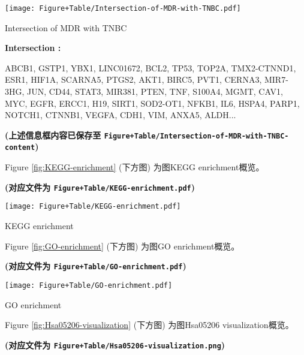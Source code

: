 \documentclass[
]{article}
\begin{document}
\def\@captype{figure}
\begin{center}
\texttt{[image: Figure+Table/Intersection-of-MDR-with-TNBC.pdf]}
\caption{Intersection of MDR with TNBC}\label{fig:Intersection-of-MDR-with-TNBC}
\end{center}
\begin{center}\begin{tcolorbox}[colback=gray!10, colframe=gray!50, width=0.9\linewidth, arc=1mm, boxrule=0.5pt]
\textbf{
Intersection
:}

\vspace{0.5em}

    ABCB1, GSTP1, YBX1, LINC01672, BCL2, TP53, TOP2A,
TMX2-CTNND1, ESR1, HIF1A, SCARNA5, PTGS2, AKT1, BIRC5,
PVT1, CERNA3, MIR7-3HG, JUN, CD44, STAT3, MIR381, PTEN,
TNF, S100A4, MGMT, CAV1, MYC, EGFR, ERCC1, H19, SIRT1,
SOD2-OT1, NFKB1, IL6, HSPA4, PARP1, NOTCH1, CTNNB1, VEGFA,
CDH1, VIM, ANXA5, ALDH...

\vspace{2em}
\end{tcolorbox}
\end{center}

\textbf{(上述信息框内容已保存至 \texttt{Figure+Table/Intersection-of-MDR-with-TNBC-content})}

Figure \ref{fig:KEGG-enrichment} (下方图) 为图KEGG enrichment概览。

\textbf{(对应文件为 \texttt{Figure+Table/KEGG-enrichment.pdf})}

\def\@captype{figure}
\begin{center}
\texttt{[image: Figure+Table/KEGG-enrichment.pdf]}
\caption{KEGG enrichment}\label{fig:KEGG-enrichment}
\end{center}

Figure \ref{fig:GO-enrichment} (下方图) 为图GO enrichment概览。

\textbf{(对应文件为 \texttt{Figure+Table/GO-enrichment.pdf})}

\def\@captype{figure}
\begin{center}
\texttt{[image: Figure+Table/GO-enrichment.pdf]}
\caption{GO enrichment}\label{fig:GO-enrichment}
\end{center}

Figure \ref{fig:Hsa05206-visualization} (下方图) 为图Hsa05206 visualization概览。

\textbf{(对应文件为 \texttt{Figure+Table/Hsa05206-visualization.png})}
\end{document}
